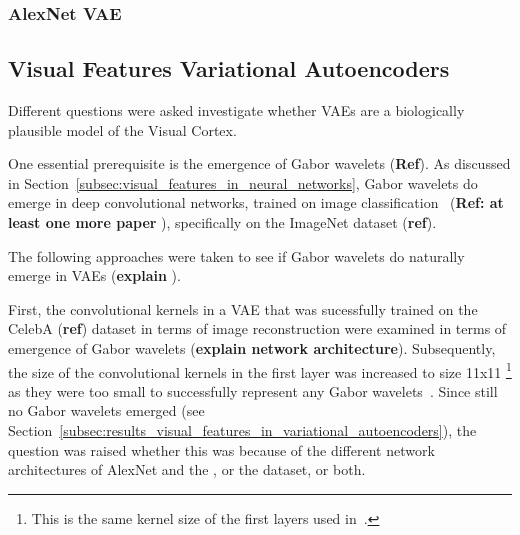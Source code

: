 \subsubsection{AlexNet VAE}

\subsection{Visual Features Variational Autoencoders}\label{subsec:visual-features-variational-autoencoders}
Different questions were asked investigate whether \acp{VAE} are a biologically plausible model of the Visual Cortex.

One essential prerequisite is the emergence of Gabor wavelets (\textbf{Ref}).
As discussed in Section~\ref{subsec:visual_features_in_neural_networks}, Gabor wavelets do emerge in deep convolutional networks, trained on image classification~\citep{krizhevsky2012imagenet} (\textbf{Ref: at least one more paper }), specifically on the ImageNet dataset (\textbf{ref}).\par
The following approaches were taken to see if Gabor wavelets do naturally emerge in \acp{VAE} (\textbf{explain }).\par
First, the convolutional kernels in a \ac{VAE} that was sucessfully trained on the CelebA (\textbf{ref}) dataset in terms of image reconstruction were examined in terms of emergence of Gabor wavelets (\textbf{explain network architecture}).
Subsequently, the size of the convolutional kernels in the first layer was increased to size 11x11 \footnote{This is the same kernel size of the first layers used in~\citet{krizhevsky2012imagenet}.} as they were too small to successfully represent any Gabor wavelets~\citep{han2019variational}.
Since still no Gabor wavelets emerged (see Section~\ref{subsec:results_visual_features_in_variational_autoencoders}), the question was raised whether this was because of the different network architectures of AlexNet and the , or the dataset, or both.

